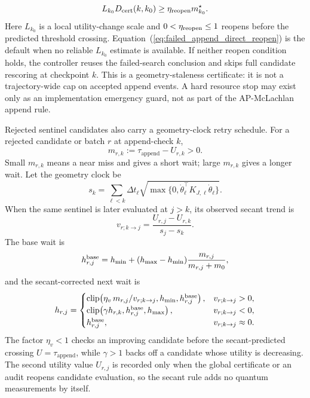 \documentclass[
  reprint,
  amsmath,
  amssymb,
  aps,
  pra,
  nofootinbib,
  superscriptaddress,
  floatfix
]{revtex4-2}
\newcommand{\app}{\mathrm{append}}
\begin{document}
\begin{equation}
L_{k_0}D_{\rm cert}(k,k_0)
\ge
\eta_{\rm reopen}m^\star_{k_0}.
\label{eq:failed_append_eta_reopen}
\end{equation}
Here $L_{k_0}$ is a local utility-change scale and $0<\eta_{\rm reopen}\le1$ reopens before the predicted threshold crossing.  Equation~(\ref{eq:failed_append_direct_reopen}) is the default when no reliable $L_{k_0}$ estimate is available.  If neither reopen condition holds, the controller reuses the failed-search conclusion and skips full candidate rescoring at checkpoint $k$.  This is a geometry-staleness certificate: it is not a trajectory-wide cap on accepted append events.  A hard resource stop may exist only as an implementation emergency guard, not as part of the AP-McLachlan append rule.

Rejected sentinel candidates also carry a geometry-clock retry schedule.  For a rejected candidate or batch $r$ at append-check $k$,
\begin{equation}
m_{r,k}:=\tau_{\app}-U_{r,k}>0.
\label{eq:failed_append_candidate_margin}
\end{equation}
Small $m_{r,k}$ means a near miss and gives a short wait; large $m_{r,k}$ gives a longer wait.  Let the geometry clock be
\begin{equation}
s_k
=
\sum_{\ell<k}
\Delta t_\ell
\sqrt{\max\{0,\dot\theta_\ell^\top K_{J,\ell}\dot\theta_\ell\}}.
\label{eq:failed_append_geometry_clock}
\end{equation}
When the same sentinel is later evaluated at $j>k$, its observed secant trend is
\begin{equation}
v_{r;k\to j}
=
\frac{U_{r,j}-U_{r,k}}{s_j-s_k}.
\label{eq:failed_append_secant_trend}
\end{equation}
The base wait is
\begin{equation}
h_{r,j}^{\rm base}
=
h_{\min}+(h_{\max}-h_{\min})
\frac{m_{r,j}}{m_{r,j}+m_0},
\label{eq:failed_append_base_wait}
\end{equation}
and the secant-corrected next wait is
\begin{equation}
h_{r,j}
=
\begin{cases}
\operatorname{clip}\!\left(
\eta_v\,m_{r,j}/v_{r;k\to j},
h_{\min},h_{r,j}^{\rm base}
\right),
& v_{r;k\to j}>0,\\
\operatorname{clip}\!\left(
\gamma h_{r,k},
h_{r,j}^{\rm base},h_{\max}
\right),
& v_{r;k\to j}<0,\\
h_{r,j}^{\rm base},
& v_{r;k\to j}\approx0 .
\end{cases}
\label{eq:failed_append_secant_wait}
\end{equation}
The factor $\eta_v<1$ checks an improving candidate before the secant-predicted crossing $U=\tau_{\app}$, while $\gamma>1$ backs off a candidate whose utility is decreasing.  The second utility value $U_{r,j}$ is recorded only when the global certificate or an audit reopens candidate evaluation, so the secant rule adds no quantum measurements by itself.
\end{document}
